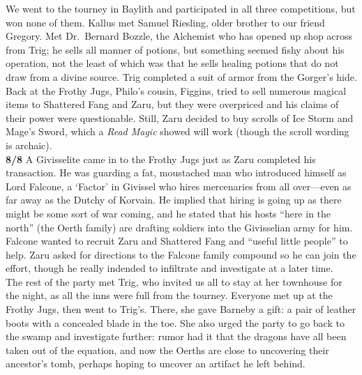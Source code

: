 \documentclass[letterpaper]{article}
\begin{document}
\noindent We went to the tourney in Baylith and participated in all three competitions, but won none of them. Kallus met Samuel Riesling, older brother to our friend Gregory.  Met Dr.\ Bernard Bozzle, the Alchemist who has opened up shop across from Trig; he sells all manner of potions, but something seemed fishy about his operation, not the least of which was that he sells healing potions that do not draw from a divine source.  Trig completed a suit of armor from the Gorger's hide. Back at the Frothy Jugs, Philo's cousin, Figgins, tried to sell numerous magical items to Shattered Fang and Zaru, but they were overpriced and his claims of their power were questionable. Still, Zaru decided to buy scrolls of Ice Storm and Mage's Sword, which a \emph{Read Magic} showed will work (though the scroll wording is archaic).\\

\noindent \textbf{8/8} A Givisselite came in to the Frothy Jugs just as Zaru completed his transaction.  He was guarding a fat, moustached man who introduced himself as Lord Falcone, a `Factor' in Givissel who hires mercenaries from all over---even as far away as the Dutchy of Korvain.  He implied that hiring is going up as there might be some sort of war coming, and he stated that his hosts ``here in the north'' (the Oerth family) are drafting soldiers into the Givisselian army for him.  Falcone wanted to recruit Zaru and Shattered Fang and ``useful little people'' to help. Zaru asked for directions to the Falcone family compound so he can join the effort, though he really indended to infiltrate and investigate at a later time.\\

\noindent The rest of the party met Trig, who invited us all to stay at her townhouse for the night, as all the inns were full from the tourney.  Everyone met up at the Frothy Jugs, then went to Trig's.  There, she gave Barneby a gift: a pair of leather boots with a concealed blade in the toe. She also urged the party to go back to the swamp and investigate further: rumor had it that the dragons have all been taken out of the equation, and now the Oerths are close to uncovering their ancestor's tomb, perhaps hoping to uncover an artifact he left behind.\\
\end{document}
